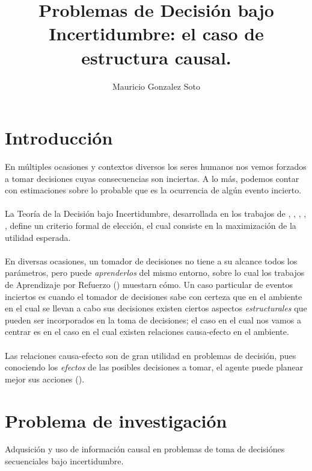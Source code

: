 \documentclass[11pt]{article}
\title{Problemas de Decisión bajo Incertidumbre: el caso de estructura causal.}
\author{Mauricio Gonzalez Soto}
\theoremstyle{plain}
\begin{document}
\maketitle
\section{Introducción}
En múltiples ocasiones y contextos diversos los seres humanos nos vemos forzados a tomar decisiones cuyas consecuencias son inciertas. A lo más, podemos contar con estimaciones sobre lo probable que es la ocurrencia de algún evento incierto.\\
\\
La Teoría de la Decisión bajo Incertidumbre, desarrollada en los trabajos de \cite{von1944theory}, \cite{definetti1930}, \cite{definetti1937}, \cite{savage1954the}, \cite{bernardo2000bayesian}, define un criterio formal de elección, el cual consiste en la maximización de la utilidad esperada.\\
\\
En diversas ocasiones, un tomador de decisiones no tiene a su alcance todos los parámetros, pero puede \textit{aprenderlos} del mismo entorno, sobre lo cual los trabajos de Aprendizaje por Refuerzo (\cite{sutton1998reinforcement}) muestarn cómo. Un caso particular de eventos inciertos es cuando el tomador de decisiones sabe con certeza que en el ambiente en el cual se llevan a cabo sus decisiones existen ciertos aspectos \textit{estructurales} que pueden ser incorporados en la toma de decisiones; el caso en el cual nos vamos a centrar es en el caso en el cual existen relaciones causa-efecto en el ambiente.\\
\\
Las relaciones causa-efecto son de gran utilidad en problemas de decisión, pues conociendo los \textit{efectos} de las posibles decisiones a tomar, el agente puede planear mejor sus acciones (\cite{hagmayer2013repeated}).\\
\section{Problema de investigación}
Adqusición y uso de información causal en problemas de toma de decisiónes secuenciales bajo incertidumbre.
\end{document}

